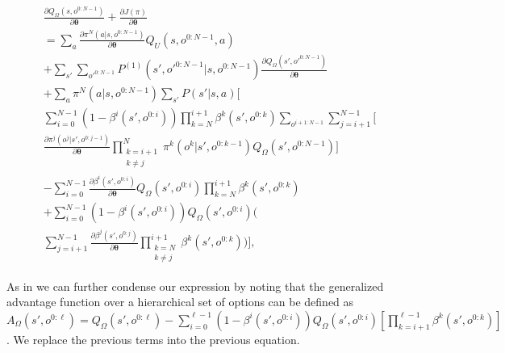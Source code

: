 \documentclass[letterpaper]{article} %
\begin{document}
\begin{equation} 
\begin{split}
\frac{\partial Q_\Omega(s,o^{0:N-1})}{\partial \bm{\theta}} + \frac{\partial J(\pi)}{\partial \bm{\theta}}\\
= \sum_{a} \frac{ \partial \pi^N(a|s,o^{0:N-1})}{\partial \bm{\theta}} Q_U(s,o^{0:N-1},a) \\
+  \sum_{s'} \sum_{o'^{0:N-1}} P^{(1)}(s',o'^{0:N-1}|s,o^{0:N-1}) \frac{\partial Q_\Omega(s',o'^{0:N-1})}{\partial \bm{\theta}} \\
+ \sum_{a} \pi^N(a|s,o^{0:N-1})  \sum_{s'} P (s'|s,a) \bigg[ \\
\sum_{i=0}^{N - 1}(1-\beta^i(s',o^{0:i})) \prod_{k=N}^{i+1} \beta^k(s',o^{0:k}) \sum_{o^{i+1:N-1}}  \sum_{j=i+1}^{N-1} \bigg[\\ \frac{ \partial \pi^j(o^j|s',o^{0:j-1})}{\partial \bm{\theta}} \prod_{\substack{k=i+1 \\ k \neq j}}^{N} \pi^k(o^k|s',o^{0:k-1}) Q_\Omega(s',o^{0:N-1}) \bigg]\\
- \sum_{i=0}^{N - 1}\frac{ \partial \beta^i(s',o^{0:i})}{\partial \bm{\theta}} Q_\Omega(s',o^{0:i}) \prod_{k=N}^{i+1} \beta^k(s',o^{0:k}) \\
+ \sum_{i=0}^{N - 1}(1-\beta^i(s',o^{0:i})) Q_\Omega(s',o^{0:i}) \bigg(\\
\sum_{j=i+1}^{N-1} \frac{ \partial \beta^j(s',o^{0:j})}{\partial \bm{\theta}} \prod_{\substack{k=N \\ k \neq j}}^{i+1} \beta^k(s',o^{0:k}) \bigg)
\bigg],
\end{split}
\end{equation}

As in \cite{hoc} we can further condense our expression by noting that the generalized advantage function over a hierarchical set of options can be defined as $A_\Omega(s',o^{0:\ell}) = Q_\Omega(s',o^{0:\ell})  - \sum_{i=0}^{\ell - 1}(1-\beta^i(s',o^{0:i})) Q_\Omega(s',o^{0:i}) [\prod_{k=i+1}^{\ell - 1} \beta^k(s',o^{0:k})]$. We replace the previous terms into the previous equation.
\end{document}
